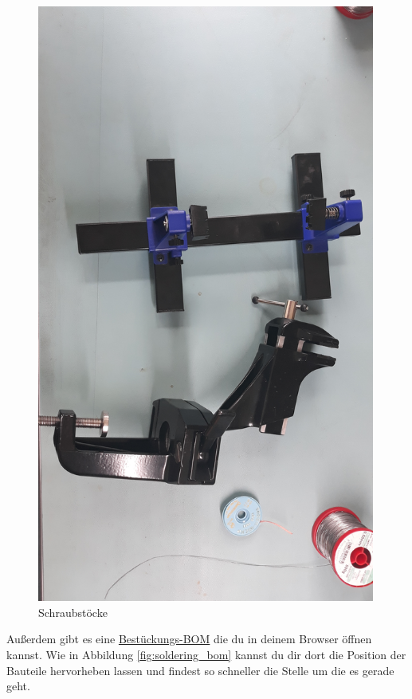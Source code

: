 \documentclass[12pt, a4paper]{article}		%
\begin{document}
\begin{figure}[H]
	\centering
		\includegraphics[width=0.99\textwidth]{Grafiken/20200726_121444.jpg}
	\caption{Schraubstöcke}
	\label{fig:20200726_121444}
\end{figure}

Außerdem gibt es eine \href{https://htmlpreview.github.io/?https://github.com/Friends-of-OpenBikeSensor/OpenBikeSensor_PCB_Board/blob/Mit_Verpolschutz/BOM_for_soldering_Rev_0.02.07.html}{Bestückungs-BOM} die du in deinem Browser öffnen kannst. Wie in Abbildung \ref{fig:soldering_bom} kannst du dir dort die Position der Bauteile hervorheben lassen und findest so schneller die Stelle um die es gerade geht.
\end{document}
